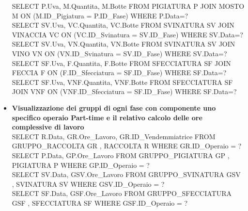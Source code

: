 \documentclass{article}
\begin{document}
\begin{itemize}
$$SELECT P.Uva, M.Quantita, M.Botte FROM PIGIATURA P JOIN MOSTO M ON (M.ID\_Pigiatura = P.ID\_Fase) WHERE P.Data=?\\\newline
SELECT SV.Uva, VC.Quantita, VC.Botte FROM SVINATURA SV JOIN VINACCIA VC ON (VC.ID\_Svinatura = SV.ID\_Fase) WHERE SV.Data=?\\\newline
SELECT SV.Uva, VN.Quantita, VN.Botte FROM SVINATURA SV JOIN VINO VN ON (VN.ID\_Svinatura = SV.ID\_Fase) WHERE SV.Data=?\\\newline
SELECT SF.Uva, F.Quantita, F.Botte FROM SFECCIATURA SF JOIN FECCIA F ON (F.ID\_Sfecciatura = SF.ID\_Fase) WHERE SF.Data=?\\\newline
SELECT SF.Uva, VNF.Quantita, VNF.Botte FROM SFECCIATURA SF JOIN VNF ON (VNF.ID\_Sfecciatura = SF.ID\_Fase) WHERE SF.Data=?\\\newline
\item \textbf{Visualizzazione dei gruppi di ogni fase con componente uno specifico operaio Part-time e il relativo calcolo delle ore complessive di lavoro }\\\newline
SELECT R.Data, GR.Ore\_Lavoro, GR.ID\_Vendemmiatrice FROM GRUPPO\_RACCOLTA GR , RACCOLTA R WHERE GR.ID\_Operaio = ?\\\newline
SELECT P.Data, GP.Ore\_Lavoro FROM GRUPPO\_PIGIATURA GP , PIGIATURA P WHERE GP.ID\_Operaio = ?\\\newline
SELECT SV.Data, GSV.Ore\_Lavoro FROM GRUPPO\_SVINATURA GSV , SVINATURA SV WHERE GSV.ID\_Operaio = ?\\\newline
SELECT SF.Data, GSF.Ore\_Lavoro FROM GRUPPO\_SFECCIATURA GSF , SFECCIATURA SF WHERE GSF.ID\_Operaio = ?\\\newline


\end{itemize}
\end{document}
